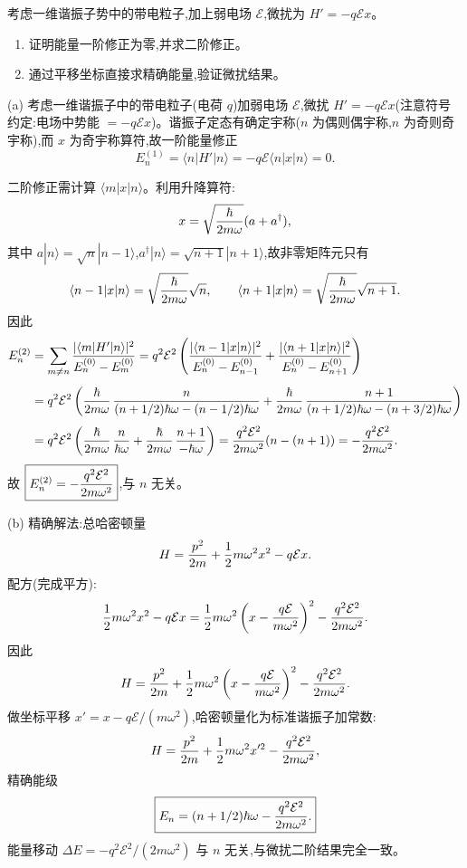 \begin{question}
考虑一维谐振子势中的带电粒子,加上弱电场 $\mathcal E$,微扰为 $H'=-q\mathcal E x$。
\begin{enumerate}
\item 证明能量一阶修正为零,并求二阶修正。
\item 通过平移坐标直接求精确能量,验证微扰结果。
\end{enumerate}
\begin{solution}
(a) 考虑一维谐振子中的带电粒子(电荷 $q$)加弱电场 $\mathcal E$,微扰 $H'=-q\mathcal Ex$(注意符号约定:电场中势能 $=-q\mathcal E x$)。谐振子定态有确定宇称($n$ 为偶则偶宇称,$n$ 为奇则奇宇称),而 $x$ 为奇宇称算符,故一阶能量修正
\[
E_n^{(1)}=\langle n|H'|n\rangle=-q\mathcal E\langle n|x|n\rangle=0.
\]

二阶修正需计算 $\langle m|x|n\rangle$。利用升降算符:
\[
x=\sqrt{\hbar\over2m\omega}(a+a^\dagger),
\]
其中 $a|n\rangle=\sqrt{n}|n-1\rangle$,$a^\dagger|n\rangle=\sqrt{n+1}|n+1\rangle$,故非零矩阵元只有
\[
\langle n-1|x|n\rangle=\sqrt{\hbar\over2m\omega}\sqrt{n},
\qquad
\langle n+1|x|n\rangle=\sqrt{\hbar\over2m\omega}\sqrt{n+1}.
\]
因此
\[
\begin{aligned}
E_n^{(2)}&=\sum_{m\ne n}{|\langle m|H'|n\rangle|^2\over E_n^{(0)}-E_m^{(0)}}
=q^2\mathcal E^2\left(
{|\langle n-1|x|n\rangle|^2\over E_n^{(0)}-E_{n-1}^{(0)}}
+{|\langle n+1|x|n\rangle|^2\over E_n^{(0)}-E_{n+1}^{(0)}}\right)\\[4pt]
&=q^2\mathcal E^2\left(
{\hbar\over2m\omega}\,{n\over (n+1/2)\hbar\omega-(n-1/2)\hbar\omega}
+{\hbar\over2m\omega}\,{n+1\over (n+1/2)\hbar\omega-(n+3/2)\hbar\omega}\right)\\[4pt]
&=q^2\mathcal E^2\left(
{\hbar\over2m\omega}\,{n\over \hbar\omega}
+{\hbar\over2m\omega}\,{n+1\over -\hbar\omega}\right)
={q^2\mathcal E^2\over2m\omega^2}(n-(n+1))
=-{q^2\mathcal E^2\over2m\omega^2}.
\end{aligned}
\]
故 $\boxed{E_n^{(2)}=-{q^2\mathcal E^2\over2m\omega^2}}$,与 $n$ 无关。

(b) 精确解法:总哈密顿量
\[
H={p^2\over2m}+{1\over2}m\omega^2x^2-q\mathcal Ex.
\]
配方(完成平方):
\[
{1\over2}m\omega^2x^2-q\mathcal Ex
={1\over2}m\omega^2\left(x-{q\mathcal E\over m\omega^2}\right)^2-{q^2\mathcal E^2\over2m\omega^2}.
\]
因此
\[
H={p^2\over2m}+{1\over2}m\omega^2\left(x-{q\mathcal E\over m\omega^2}\right)^2-{q^2\mathcal E^2\over2m\omega^2}.
\]
做坐标平移 $x'=x-q\mathcal E/(m\omega^2)$,哈密顿量化为标准谐振子加常数:
\[
H={p^2\over2m}+{1\over2}m\omega^2x'^2-{q^2\mathcal E^2\over2m\omega^2},
\]
精确能级
\[
\boxed{E_n=(n+1/2)\hbar\omega-{q^2\mathcal E^2\over2m\omega^2}.}
\]
能量移动 $\Delta E=-q^2\mathcal E^2/(2m\omega^2)$ 与 $n$ 无关,与微扰二阶结果完全一致。
\end{solution}
\end{question}


